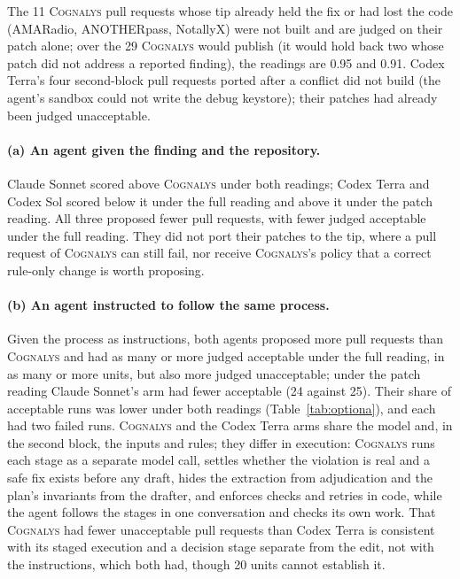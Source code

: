 \documentclass[conference]{IEEEtran}
\newcommand{\system}{\textsc{Cognalys}}
\begin{document}
The 11 \system{} pull requests whose tip already held the fix or had lost the
code (AMARadio, ANOTHERpass, NotallyX) were not built and are judged on their
patch alone; over the 29 \system{} would publish (it would hold back two whose
patch did not address a reported finding), the readings are 0.95 and 0.91.
Codex Terra's four second-block pull requests ported after a conflict did not
build (the agent's sandbox could not write the debug keystore); their patches
had already been judged unacceptable.

\paragraph{(a) An agent given the finding and the repository.} Claude Sonnet
scored above \system{} under both readings; Codex Terra and Codex Sol scored
below it under the full reading and above it under the patch reading. All
three proposed fewer pull requests, with fewer judged acceptable under the
full reading. They did not port
their patches to the tip, where a pull request of \system{} can still fail, nor
receive \system{}'s policy that a correct rule-only change is worth proposing.

\paragraph{(b) An agent instructed to follow the same process.}
Given the process as instructions, both agents proposed more pull requests
than \system{} and had as many or more judged acceptable under the full
reading, in as many or more units, but also more judged unacceptable; under
the patch reading Claude Sonnet's arm had fewer acceptable (24 against 25).
Their share of acceptable runs was lower under both readings
(Table~\ref{tab:optiona}), and each had two failed runs. \system{} and the
Codex Terra arms share the model and, in the second block, the inputs and
rules; they differ in execution: \system{} runs each stage as a separate model
call, settles whether the violation is real and a safe fix exists before any
draft, hides the extraction from adjudication and the plan's invariants from
the drafter, and enforces checks and retries in code, while the agent follows
the stages in one conversation and checks its own work. That \system{} had fewer
unacceptable pull requests than Codex Terra is consistent with its staged
execution and a decision stage separate from the edit, not with the instructions, which both
had, though 20 units cannot establish it.
\end{document}
